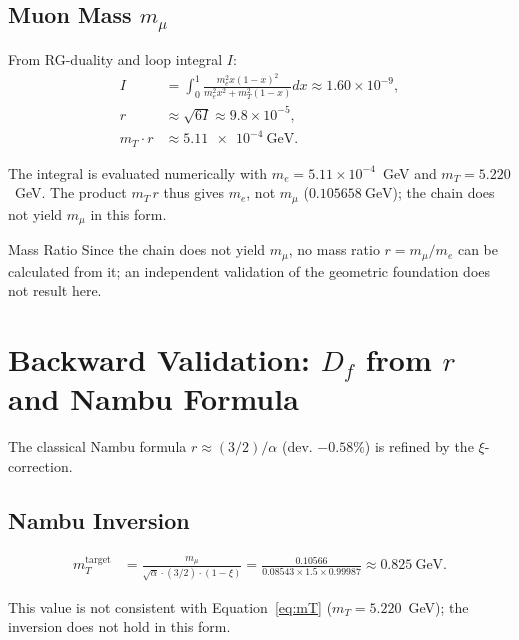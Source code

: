 	\subsection{Muon Mass $m_{\mu}$}
	\label{subsec:muon_mass}
	
	From RG-duality and loop integral $I$:
	\begin{align}
		I &= \int_0^1 \frac{m_e^2 x (1-x)^2}{m_e^2 x^2 + m_T^2 (1-x)}  dx \approx 1.60 \times 10^{-9}, \label{eq:I} \\
		r &\approx \sqrt{6 I} \approx 9.8 \times 10^{-5}, \label{eq:r} \\
		m_T \cdot r &\approx \SI{5.11e-4}{\giga\electronvolt}. \label{eq:mmu}
	\end{align}

	The integral is evaluated numerically with $m_e = 5.11\times10^{-4}$~GeV and $m_T = 5.220$~GeV. The product $m_T\,r$ thus gives $m_e$, not $m_\mu$ ($\SI{0.105658}{\giga\electronvolt}$); the chain does not yield $m_\mu$ in this form.
	
	\begin{important}{Mass Ratio}{}
		Since the chain does not yield $m_\mu$, no mass ratio $r = m_{\mu} / m_e$ can be calculated from it; an independent validation of the geometric foundation does not result here.
	\end{important}
	
	\section{Backward Validation: $D_f$ from $r$ and Nambu Formula}
	\label{sec:backward_validation}
	
	The classical Nambu formula $r \approx (3/2)/\alpha$ (dev. $-0.58\%$) is refined by the $\xi$-correction.
	
	\subsection{Nambu Inversion}
	\label{subsec:nambu_inversion}
	
	\begin{align}
		m_T^{\text{target}} &= \frac{m_{\mu}}{\sqrt{\alpha} \cdot (3/2) \cdot (1 - \xi)} = \frac{0.10566}{0.08543\times1.5\times0.99987} \approx \SI{0.825}{\giga\electronvolt}. \label{eq:mTtarget}
	\end{align}

	This value is not consistent with Equation~\eqref{eq:mT} ($m_T = 5.220$~GeV); the inversion does not hold in this form.
	
